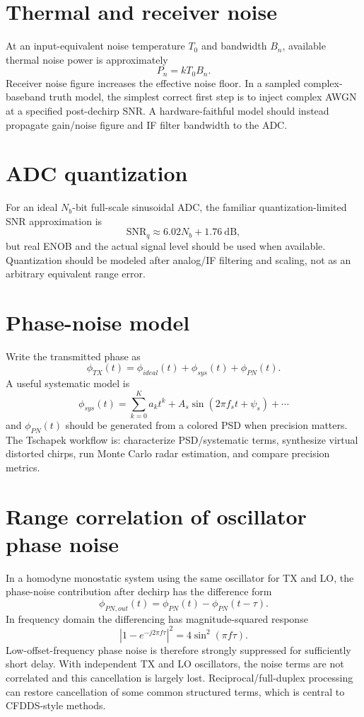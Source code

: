 \documentclass[11pt]{article}
\begin{document}
\section{Thermal and receiver noise}
At an input-equivalent noise temperature $T_0$ and bandwidth $B_n$, available thermal noise power is approximately
\[
P_n=kT_0B_n.
\]
Receiver noise figure increases the effective noise floor. In a sampled complex-baseband truth model, the simplest correct first step is to inject complex AWGN at a specified post-dechirp SNR. A hardware-faithful model should instead propagate gain/noise figure and IF filter bandwidth to the ADC.

\section{ADC quantization}
For an ideal $N_b$-bit full-scale sinusoidal ADC, the familiar quantization-limited SNR approximation is
\[
\mathrm{SNR}_{q}\approx 6.02N_b+1.76\ \mathrm{dB},
\]
but real ENOB and the actual signal level should be used when available. Quantization should be modeled after analog/IF filtering and scaling, not as an arbitrary equivalent range error.

\section{Phase-noise model}
Write the transmitted phase as
\[
\phi_{TX}(t)=\phi_{ideal}(t)+\phi_{sys}(t)+\phi_{PN}(t).
\]
A useful systematic model is
\[
\phi_{sys}(t)=\sum_{k=0}^{K} a_k t^k + A_s\sin(2\pi f_s t+\psi_s)+\cdots
\]
and $\phi_{PN}(t)$ should be generated from a colored PSD when precision matters. The Tschapek workflow is: characterize PSD/systematic terms, synthesize virtual distorted chirps, run Monte Carlo radar estimation, and compare precision metrics.

\section{Range correlation of oscillator phase noise}
In a homodyne monostatic system using the same oscillator for TX and LO, the phase-noise contribution after dechirp has the difference form
\[
\phi_{PN,out}(t)=\phi_{PN}(t)-\phi_{PN}(t-\tau).
\]
In frequency domain the differencing has magnitude-squared response
\[
|1-e^{-j2\pi f\tau}|^2=4\sin^2(\pi f\tau).
\]
Low-offset-frequency phase noise is therefore strongly suppressed for sufficiently short delay. With independent TX and LO oscillators, the noise terms are not correlated and this cancellation is largely lost. Reciprocal/full-duplex processing can restore cancellation of some common structured terms, which is central to CFDDS-style methods.
\end{document}
